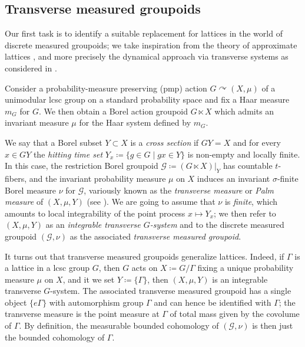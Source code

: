 \documentclass[11pt, oneside]{amsart}
\theoremstyle{definition}
\theoremstyle{remark}
\theoremstyle{TheoremNum}
\newcommand{\cG}{\mathcal{G}}
\begin{document}
\subsection{Transverse measured groupoids}


Our first task is to identify a suitable replacement for lattices in the world of discrete measured groupoids; we take inspiration from the theory of approximate lattices \cite{BHApproximateLattices}, and more precisely the dynamical approach via transverse systems as considered in \cite{BHK, BHSiegel, ABC}.

Consider a probability-measure preserving (pmp) action $G \curvearrowright (X, \mu)$ of a unimodular lcsc group on a standard probability space and fix a Haar measure $m_G$ for $G$. We then obtain a Borel action groupoid $G \ltimes X$ which admits an invariant measure $\mu$ for the Haar system defined by $m_G$.

We say that a Borel subset $Y \subset X$ is a \emph{cross section} if $GY = X$ and for every $x \in GY$ the \emph{hitting time set} $Y_x \coloneqq \{g \in G \mid gx \in Y\}$ is non-empty and locally finite. In this case, the restriction Borel groupoid $\cG \coloneqq (G \ltimes X)|_Y$ has countable $t$-fibers, and the invariant probability measure $\mu$ on $X$ induces an invariant $\sigma$-finite Borel measure $\nu$ for $\cG$, variously known as the \emph{transverse measure} or \emph{Palm measure} of $(X, \mu, Y)$ (see \cite{ABC}). We are going to assume that $\nu$ is \emph{finite}, which amounts to local integrability of the point process $x \mapsto Y_x$; we then refer to $(X, \mu, Y)$ as an \emph{integrable transverse $G$-system} and to the discrete measured groupoid $(\cG, \nu)$ as the associated \emph{transverse measured groupoid}.

It turns out that transverse measured groupoids generalize lattices. Indeed, if $\Gamma$ is a lattice in a lcsc group $G$, then $G$ acts on $X \coloneqq G/\Gamma$ fixing a unique probability measure $\mu$ on $X$, and it we set $Y \coloneqq \{\Gamma\}$, then $(X, \mu, Y)$ is an integrable transverse $G$-system. The associated transverse measured groupoid has a single object $\{e\Gamma\}$ with automorphism group $\Gamma$ and can hence be identified with $\Gamma$; the transverse measure is the point measure at $\Gamma$ of total mass given by the covolume of $\Gamma$. By definition, the measurable bounded cohomology of $(\cG, \nu)$ is then just the bounded cohomology of $\Gamma$.
\end{document}
